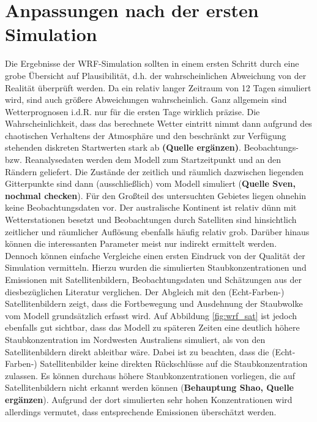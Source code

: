 \documentclass[12pt,a4paper,onecolumn]{scrartcl}
\begin{document}
\section{Anpassungen nach der ersten Simulation}
Die Ergebnisse der WRF-Simulation sollten in einem ersten Schritt durch eine grobe Übersicht auf Plausibilität, d.h. der wahrscheinlichen Abweichung von der Realität überprüft werden. Da ein relativ langer Zeitraum von 12 Tagen simuliert wird, sind auch größere Abweichungen wahrscheinlich. Ganz allgemein sind Wetterprognosen i.d.R. nur für die ersten Tage wirklich präzise. Die Wahrscheinlichkeit, dass das berechnete Wetter eintritt nimmt dann aufgrund des chaotischen Verhaltens der Atmosphäre und den beschränkt zur Verfügung stehenden diskreten Startwerten stark ab \textbf{(Quelle ergänzen)}. Beobachtungs- bzw. Reanalysedaten werden dem Modell zum Startzeitpunkt und an den Rändern geliefert. Die Zustände der zeitlich und räumlich dazwischen liegenden Gitterpunkte sind dann (ausschließlich) vom Modell simuliert (\textbf{Quelle Sven, nochmal checken}). Für den Großteil des untersuchten Gebietes liegen ohnehin keine Beobachtungsdaten vor. Der australische Kontinent ist relativ dünn mit Wetterstationen besetzt und Beobachtungen durch Satelliten sind hinsichtlich  zeitlicher und räumlicher Auflösung ebenfalls häufig relativ grob. Darüber hinaus können die interessanten Parameter meist nur indirekt ermittelt werden.\\

Dennoch können einfache Vergleiche einen ersten Eindruck von der Qualität der Simulation vermitteln. Hierzu wurden die simulierten Staubkonzentrationen und Emissionen mit Satellitenbildern, Beobachtungsdaten und Schätzungen aus der diesbezüglichen Literatur verglichen. Der Abgleich mit den (Echt-Farben-) Satellitenbildern zeigt, dass die Fortbewegung und Ausdehnung der Staubwolke vom Modell grundsätzlich erfasst wird. Auf Abbildung \ref{fig:wrf_sat} ist jedoch ebenfalls gut sichtbar, dass das Modell zu späteren Zeiten eine deutlich höhere Staubkonzentration im Nordwesten Australiens simuliert, als von den Satellitenbildern direkt ableitbar wäre. Dabei ist zu beachten, dass die (Echt-Farben-) Satellitenbilder keine direkten Rückschlüsse auf die Staubkonzentration zulassen. Es können durchaus höhere Staubkonzentrationen vorliegen, die auf Satellitenbildern nicht erkannt werden können (\textbf{Behauptung Shao, Quelle ergänzen}). Aufgrund der dort simulierten sehr hohen Konzentrationen wird allerdings vermutet, dass entsprechende Emissionen überschätzt werden.
\end{document}
